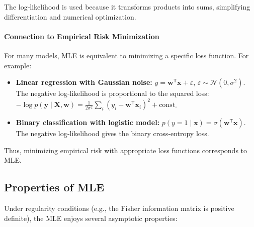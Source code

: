 \documentclass{tufte-handout}
\begin{document}
The log‑likelihood is used because it transforms products into sums, simplifying differentiation and numerical optimization.

\begin{marginfigure}
\centering
{}
\caption{Log‑likelihood for a Binomial experiment (20 successes, 30 failures); the MLE is $\hat{\theta}=0.4$.}
\end{marginfigure}

\paragraph{Connection to Empirical Risk Minimization}
For many models, MLE is equivalent to minimizing a specific loss function. For example:
\begin{itemize}
    \item \textbf{Linear regression with Gaussian noise:} $y = \mathbf{w}^{\mathsf{T}}\mathbf{x} + \varepsilon$, $\varepsilon \sim \mathcal{N}(0,\sigma^2)$. The negative log‑likelihood is proportional to the squared loss: $-\log p(\mathbf{y} \mid \mathbf{X}, \mathbf{w}) = \frac{1}{2\sigma^2}\sum_i (y_i - \mathbf{w}^{\mathsf{T}}\mathbf{x}_i)^2 + \text{const}$.
    \item \textbf{Binary classification with logistic model:} $p(y=1 \mid \mathbf{x}) = \sigma(\mathbf{w}^{\mathsf{T}}\mathbf{x})$. The negative log‑likelihood gives the binary cross‑entropy loss.
\end{itemize}
Thus, minimizing empirical risk with appropriate loss functions corresponds to MLE.

\subsection{Properties of MLE}

Under regularity conditions (e.g., the Fisher information matrix is positive definite), the MLE enjoys several asymptotic properties:
\end{document}

